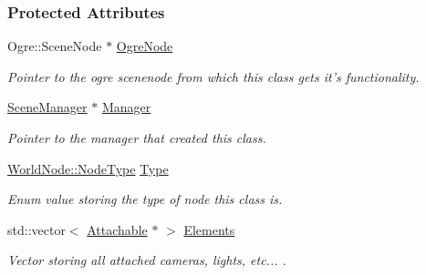 \subsubsection*{Protected Attributes}
\begin{DoxyCompactItemize}
\item 
\hypertarget{classphys_1_1WorldNode_abc3e4ddcd1dc2f15ffa40ed2d18b5fd8}{
Ogre::SceneNode $\ast$ \hyperlink{classphys_1_1WorldNode_abc3e4ddcd1dc2f15ffa40ed2d18b5fd8}{OgreNode}}
\label{d2/d3e/classphys_1_1WorldNode_abc3e4ddcd1dc2f15ffa40ed2d18b5fd8}

\begin{DoxyCompactList}\small\item\em Pointer to the ogre scenenode from which this class gets it's functionality. \item\end{DoxyCompactList}\item 
\hypertarget{classphys_1_1WorldNode_a070f1686f70880dac0241c96518c7a8a}{
\hyperlink{classphys_1_1SceneManager}{SceneManager} $\ast$ \hyperlink{classphys_1_1WorldNode_a070f1686f70880dac0241c96518c7a8a}{Manager}}
\label{d2/d3e/classphys_1_1WorldNode_a070f1686f70880dac0241c96518c7a8a}

\begin{DoxyCompactList}\small\item\em Pointer to the manager that created this class. \item\end{DoxyCompactList}\item 
\hypertarget{classphys_1_1WorldNode_aef2329f38799c3d67f1f1f69b35dda20}{
\hyperlink{classphys_1_1WorldNode_a0b178b06aa411b00c4c2ccd926d9bf5a}{WorldNode::NodeType} \hyperlink{classphys_1_1WorldNode_aef2329f38799c3d67f1f1f69b35dda20}{Type}}
\label{d2/d3e/classphys_1_1WorldNode_aef2329f38799c3d67f1f1f69b35dda20}

\begin{DoxyCompactList}\small\item\em Enum value storing the type of node this class is. \item\end{DoxyCompactList}\item 
\hypertarget{classphys_1_1WorldNode_a2a17c53f3a7ad3d5bd322855096fcbc3}{
std::vector$<$ \hyperlink{classphys_1_1Attachable}{Attachable} $\ast$ $>$ \hyperlink{classphys_1_1WorldNode_a2a17c53f3a7ad3d5bd322855096fcbc3}{Elements}}
\label{d2/d3e/classphys_1_1WorldNode_a2a17c53f3a7ad3d5bd322855096fcbc3}

\begin{DoxyCompactList}\small\item\em Vector storing all attached cameras, lights, etc... . \item\end{DoxyCompactList}\end{DoxyCompactItemize}


